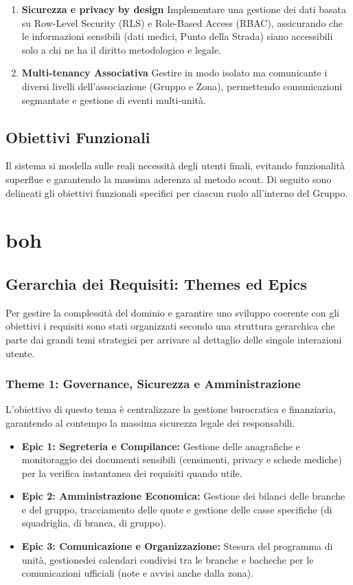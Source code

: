 \documentclass[11pt]{article}
\begin{document}
\begin{enumerate}
  Garantire la piena funzionalità dell'app durante l'attività in ambienti isolati, grazie alla sincronizzazione asincrona.
  \item \textbf{Sicurezza e privacy by design}
  Implementare una gestione dei dati basata su Row-Level Security (RLS) e Role-Based Access (RBAC), assicurando che le informazioni sensibili (dati medici, Punto della Strada) siano accessibili solo a chi ne ha il diritto metodologico e legale.
  \item \textbf{Multi-tenancy Associativa}
  Gestire in modo isolato ma comunicante i diversi livelli dell'associazione (Gruppo e Zona), permettendo comunicazioni segmantate e gestione di eventi multi-unità.
\end{enumerate}

\subsection{Obiettivi Funzionali}
Il sistema si modella sulle reali necessità degli utenti finali, evitando funzionalità superflue e garantendo la massima aderenza al metodo scout. Di seguito sono delineati gli obiettivi funzionali specifici per ciascun ruolo all'interno del Gruppo.


\newpage

\section{boh}
\subsection{Gerarchia dei Requisiti: Themes ed Epics}
Per gestire la complessità del dominio e garantire uno sviluppo coerente con gli obiettivi i requisiti sono stati organizzati secondo una struttura gerarchica che parte dai grandi temi strategici per arrivare al dettaglio delle singole interazioni utente.

\subsubsection{Theme 1: Governance, Sicurezza e Amministrazione} L'obiettivo di questo tema è centralizzare la gestione burocratica e finanziaria, garantendo al contempo la massima sicurezza legale dei responsabili.
\begin{itemize}
  \item \textbf{Epic 1: Segreteria e Compilance:} Gestione delle anagrafiche e monitoraggio dei documenti sensibili (censimenti, privacy e schede mediche) per la verifica instantanea dei requisiti quando utile.
  \item \textbf{Epic 2: Amministrazione Economica:} Gestione dei bilanci delle branche e del gruppo, tracciamento delle quote e gestione delle casse specifiche (di squadriglia, di branca, di gruppo).
  \item \textbf{Epic 3: Comunicazione e Organizzazione:} Stesura del programma di unità, gestionedei calendari condivisi tra le branche e bacheche per le comunicazioni ufficiali (note e avvisi anche dalla zona). 
\end{itemize}
\end{document}
